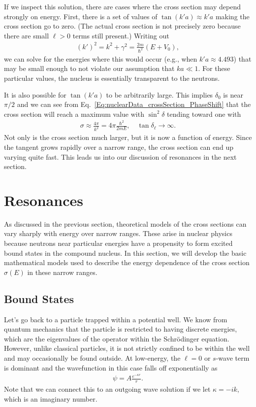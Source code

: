 If we inspect this solution, there are cases where the cross section may depend strongly on energy. First, there  is a set of values of $\tan(k'a) \approx k'a$ making the cross section go to zero. (The actual cross section is not precisely zero because there are small $\ell > 0$ terms still present.) Writing out
\begin{align}
  (k')^2 = k^2 + \gamma^2 = \frac{2m}{\hbar^2} ( E + V_0 ) , \nonumber
\end{align}
we can solve for the energies where this would occur (e.g., when $k'a \approx 4.493$) that may be small enough to not violate our assumption that $ka \ll 1$. For these particular values, the nucleus is essentially transparent to the neutrons. 

It is also possible for $\tan(k'a)$ to be arbitrarily large. This implies $\delta_0$ is near $\pi/2$ and we can see from Eq.~\eqref{Eq:nuclearData_crossSection_PhaseShift} that the cross section will reach a maximum value with $\sin^2\delta$ tending toward one with
\begin{align}
  \sigma \approx \frac{4\pi}{k^2} = 4\pi \frac{\hbar^2}{2mE}, \quad \tan\delta_\ell \rightarrow \infty .
\end{align}
Not only is the cross section much larger, but it is now a function of energy. Since the tangent grows rapidly over a narrow range, the cross section can end up varying quite fast. This leads us into our discussion of resonances in the next section.

\section{Resonances}

As discussed in the previous section, theoretical models of the cross sections can vary sharply with energy over narrow ranges. These arise in nuclear physics because neutrons near particular energies have a propensity to form excited bound states in the compound nucleus. In this section, we will develop the basic mathematical models used to describe the energy dependence of the cross section $\sigma(E)$ in these narrow ranges.

\subsection{Bound States}

Let's go back to a particle trapped within a potential well. We know from quantum mechanics that the particle is restricted to having discrete energies, which are the eigenvalues of the operator within the Schr\"{o}dinger equation. However, unlike classical particles, it is not strictly confined to be within the well and may occasionally be found outside. At low-energy, the $\ell = 0$ or $s$-wave term is dominant and the wavefunction in this case falls off exponentially as
\begin{align}
  \psi = A \frac{e^{-\kappa r}}{r} .
\end{align}
Note that we can connect this to an outgoing wave solution if we let $\kappa = -ik$, which is an imaginary number.

